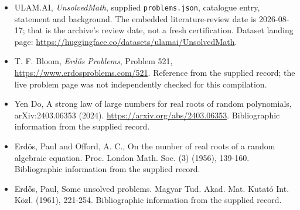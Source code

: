 \documentclass[11pt,a4paper]{article}
\begin{document}
{\small

\begin{itemize}

\item[\hypertarget{source:statement:1}{S1}] ULAM.AI, \emph{UnsolvedMath}, supplied \texttt{problems.json}, catalogue entry, statement and background. The embedded literature-review date is 2026-08-17; that is the archive’s review date, not a fresh certification. Dataset landing page: \url{https://huggingface.co/datasets/ulamai/UnsolvedMath}.

\item[\hypertarget{source:statement:2}{S2}] T. F. Bloom, \emph{Erdős Problems}, Problem 521, \url{https://www.erdosproblems.com/521}. Reference from the supplied record; the live problem page was not independently checked for this compilation.

\item[\hypertarget{source:statement:3}{S3}] Yen Do, A strong law of large numbers for real roots of random polynomials, arXiv:2403.06353 (2024). \url{https://arxiv.org/abs/2403.06353}. Bibliographic information from the supplied record.

\item[\hypertarget{source:statement:4}{S4}] Erd\"{o}s, Paul and Offord, A. C., On the number of real roots of a random algebraic equation. Proc. London Math. Soc. (3) (1956), 139-160. Bibliographic information from the supplied record.

\item[\hypertarget{source:statement:5}{S5}] Erd\H{o}s, Paul, Some unsolved problems. Magyar Tud. Akad. Mat. Kutat\'{o} Int. K\"{o}zl. (1961), 221-254. Bibliographic information from the supplied record.

\end{itemize}

}

\label{end:statement}
\end{document}
